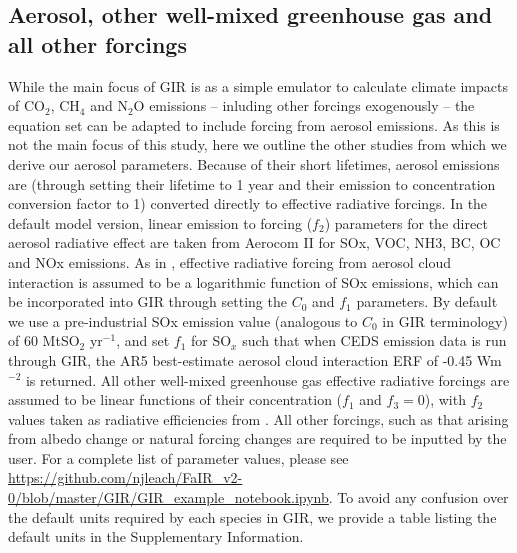 \documentclass[gmd, manuscript]{copernicus}
\begin{document}
\subsection*{Aerosol, other well-mixed greenhouse gas and all other forcings}
While the main focus of GIR is as a simple emulator to calculate climate impacts of CO$_2$, CH$_4$ and N$_2$O emissions -- inluding other forcings exogenously -- the equation set can be adapted to include forcing from aerosol emissions. As this is not the main focus of this study, here we outline the other studies from which we derive our aerosol parameters. Because of their short lifetimes, aerosol emissions are (through setting their lifetime to 1 year and their emission to concentration conversion factor to 1) converted directly to effective radiative forcings. In the default model version, linear emission to forcing ($f_2$) parameters for the direct aerosol radiative effect are taken from Aerocom II \citep{Myhre2013a} for SOx, VOC, NH3, BC, OC and NOx emissions. As in \cite{Stevens2015}, effective radiative forcing from aerosol cloud interaction is assumed to be a logarithmic function of SOx emissions, which can be incorporated into GIR through setting the $C_0$ and $f_1$ parameters. By default we use a pre-industrial SOx emission value (analogous to $C_0$ in GIR terminology) of 60 MtSO$_2$ yr$^{-1}$, and set $f_1$ for SO$_x$ such that when CEDS emission data is run through GIR, the AR5 best-estimate aerosol cloud interaction ERF of -0.45 Wm$^{-2}$ is returned. All other well-mixed greenhouse gas effective radiative forcings are assumed to be linear functions of their concentration ($f_1$ and $f_3 = 0$), with $f_2$ values taken as radiative efficiencies from \cite{Etminan}.  All other forcings, such as that arising from albedo change or natural forcing changes are required to be inputted by the user. For a complete list of parameter values, please see \url{https://github.com/njleach/FaIR_v2-0/blob/master/GIR/GIR_example_notebook.ipynb}. To avoid any confusion over the default units required by each species in GIR, we provide a table listing the default units in the Supplementary Information.
\end{document}
